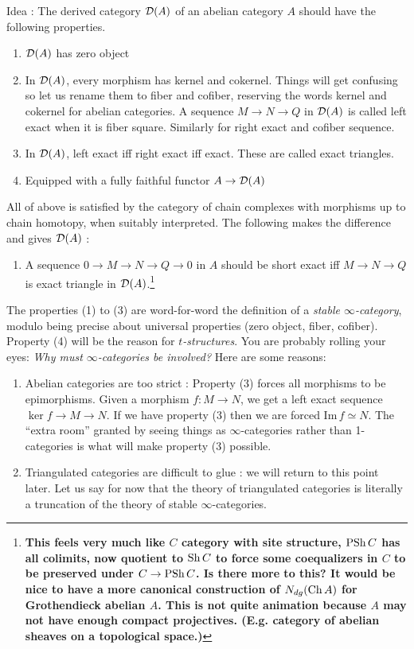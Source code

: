 \documentclass{article}
\begin{document}
Idea : The derived category $\mathcal{D}(A)$ of an abelian category $A$ should 
have the following properties.
\begin{enumerate}
  \item $\mathcal{D}(A)$ has zero object
  \item In $\mathcal{D}(A)$, every morphism has kernel and cokernel.
  Things will get confusing so let us rename them to fiber and cofiber,
  reserving the words kernel and cokernel for abelian categories.
  A sequence $M \to N \to Q$ in $\mathcal{D}(A)$ 
  is called left exact when it is fiber square.
  Similarly for right exact and cofiber sequence.
  \item In $\mathcal{D}(A)$, left exact iff right exact iff exact.
  These are called exact triangles.
  \item Equipped with a fully faithful functor $A \to \mathcal{D}(A)$
\end{enumerate}
All of above is satisfied by the category of chain complexes
with morphisms up to chain homotopy,
when suitably interpreted.
The following makes the difference and gives $\mathcal{D}(A)$ : 
\begin{enumerate}[resume]
  \item A sequence $0 \to M \to N \to Q \to 0$ in $A$ should be
  short exact iff $M \to N \to Q$ is exact triangle in $\mathcal{D}(A)$.\footnote{
    \textbf{This feels very much like 
  $C$ category with site structure,
  $\operatorname{PSh} C$ has all colimits,
  now quotient to $\operatorname{Sh} C$ to force some coequalizers in $C$
  to be preserved under $C \to \operatorname{PSh} C$.
  Is there more to this?
  It would be nice to have a more canonical construction of
  $N_{dg}(\mathrm{Ch} \, A)$ for Grothendieck abelian $A$.
  This is not quite animation because $A$ may not have enough
  compact projectives. 
  (E.g. category of abelian sheaves on a topological space.)
}
  }
\end{enumerate}
The properties (1) to (3) are word-for-word the definition
of a \emph{stable $\infty$-category},\cite[Def. 1.1.1.9]{lurie-HA}
modulo being precise about universal properties (zero object,
fiber, cofiber).
Property (4) will be the reason for \emph{$t$-structures}.
You are probably rolling your eyes: 
\emph{Why must $\infty$-categories be involved?}
Here are some reasons: 
\begin{enumerate}
  \item Abelian categories are too strict : 
  Property (3) forces all morphisms to be epimorphisms.
  Given a morphism $f : M \to N$, 
  we get a left exact sequence $\ker f \to M \to N$.
  If we have property (3) then we are forced $\mathrm{Im}\,f \simeq N$.
  The ``extra room'' granted by seeing things as 
  $\infty$-categories rather than 1-categories is 
  what will make property (3) possible.
  
  \item Triangulated categories are difficult to glue : 
  we will return to this point later.
  Let us say for now that 
  the theory of triangulated categories is literally a truncation
  of the theory of stable $\infty$-categories.\cite[Thm. 1.1.2.14]{lurie-HA}
\end{enumerate}
\end{document}
